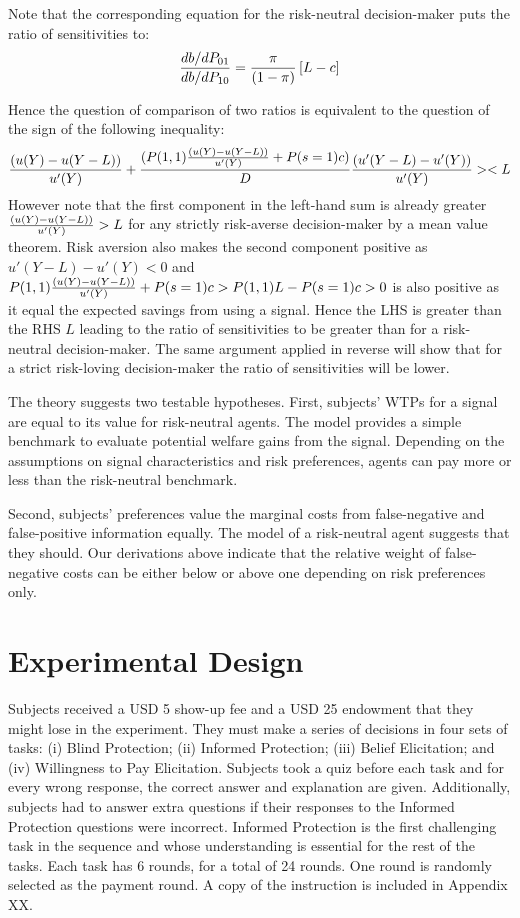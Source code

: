 \documentclass[12pt,a4paper]{article}
\begin{document}
Note that the corresponding equation for the risk-neutral decision-maker puts the ratio of sensitivities to:
\[{db/dP_{01} \over db/dP_{10}}= {\pi \over (1-\pi)} \left[L-c \right] \]

Hence the question of comparison of two ratios is equivalent to the question of the sign of the following inequality:
\[{(u(Y)-u(Y-L)) \over u'(Y)}+{(P(1,1){(u(Y)-u(Y-L)) \over u'(Y)}+P(s=1)c) \over D}{(u'(Y-L)-u'(Y))\over u'(Y)}><L\]
However note that the first component in the left-hand sum is already greater ${(u(Y)-u(Y-L)) \over u'(Y)}>L$ for any strictly risk-averse decision-maker by a mean value theorem. Risk aversion also makes the second component positive as  $u'(Y-L)-u'(Y)<0$ and $P(1,1){(u(Y)-u(Y-L)) \over u'(Y)}+P(s=1)c>P(1,1)L-P(s=1)c>0$ is also positive as it equal the expected savings from using a signal. Hence the LHS is greater than the RHS $L$ leading to the ratio of sensitivities to be greater than for a risk-neutral decision-maker. The same argument applied in reverse will show that for a strict risk-loving decision-maker the ratio of sensitivities will be lower. 


\vspace{10pt}
\noindent The theory suggests two testable hypotheses. First, subjects' WTPs for a signal are equal to its value for risk-neutral agents. The model provides a simple benchmark to evaluate potential welfare gains from the signal. Depending on the assumptions on signal characteristics and risk preferences, agents can pay more or less than the risk-neutral benchmark.

Second, subjects' preferences value the marginal costs from false-negative and false-positive information equally. The model of a risk-neutral agent suggests that they should. Our derivations above indicate that the relative weight of false-negative costs can be either below or above one depending on risk preferences only.




\vspace{20pt}

\section{Experimental Design}

Subjects received a USD 5 show-up fee and a USD 25 endowment that they might lose in the experiment. They must make a series of decisions in four sets of tasks: (i) Blind Protection; (ii) Informed Protection; (iii) Belief Elicitation; and (iv) Willingness to Pay Elicitation. Subjects took a quiz before each task and for every wrong response, the correct answer and explanation are given. Additionally, subjects had to answer extra questions if their responses to the Informed Protection questions were incorrect. Informed Protection is the first challenging task in the sequence and whose understanding is essential for the rest of the tasks.
Each task has 6 rounds, for a total of 24 rounds. One round is randomly selected as the payment round. A copy of the instruction is included in Appendix XX.
\end{document}
